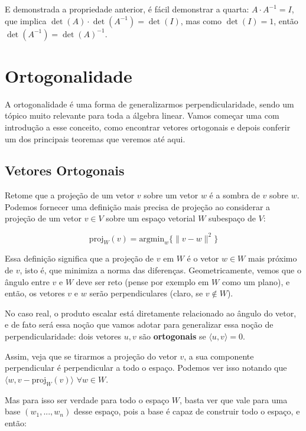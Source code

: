 \documentclass[11pt, a4paper]{article}
\begin{document}
 E demonstrada a propriedade anterior, é fácil demonstrar a quarta: \(A\cdot A^{-1}=I\), que implica \(\det(A)\cdot \det(A^{-1})=\det(I)\), mas como \(\det(I)=1\), então \(\det(A^{-1})=\det(A)^{-1}\).

\newpage

\section{Ortogonalidade}

A ortogonalidade é uma forma de generalizarmos perpendicularidade, sendo um tópico muito relevante para toda a álgebra linear. Vamos começar uma com introdução a esse conceito, como encontrar vetores ortogonais e depois conferir um dos principais teoremas que veremos até aqui.

\subsection{Vetores Ortogonais}

Retome que a projeção de um vetor \(v\) sobre um vetor \(w\) é a sombra de \(v\) sobre \(w\). Podemos fornecer uma definição mais precisa de projeção ao considerar a projeção de um vetor \(v\in V\) sobre um espaço vetorial \(W\) subespaço de \(V\):

\void[-1]

\[\text{proj}_W(v)=\text{argmin}_w\{\|v-w\|^2\}\]

\void[-0.4]

Essa definição significa que a projeção de \(v\) em \(W\) é o vetor \(w\in W\) mais próximo de \(v\), isto é, que minimiza a norma das diferenças. Geometricamente, vemos que o ângulo entre \(v\) e \(W\) deve ser reto (pense por exemplo em \(W\) como um plano), e então, os vetores \(v\) e \(w\) serão perpendiculares (claro, se \(v \not \in W\)). 

No caso real, o produto escalar está diretamente relacionado ao ângulo do vetor, e de fato será essa noção que vamos adotar para generalizar essa noção de perpendicularidade: dois vetores \(u,v\) são \textbf{ortogonais} se \(\langle u,v \rangle=0\).

Assim, veja que se tirarmos a projeção do vetor \(v\), a sua componente perpendicular é perpendicular a todo o espaço. Podemos ver isso notando que \(\langle w, v-\text{proj}_W(v)\rangle\) \(\forall w \in W\).

Mas para isso ser verdade para todo o espaço \(W\), basta ver que vale para uma base \((w_1,...,w_n)\) desse espaço, pois a base é capaz de construir todo o espaço, e então:
\end{document}
